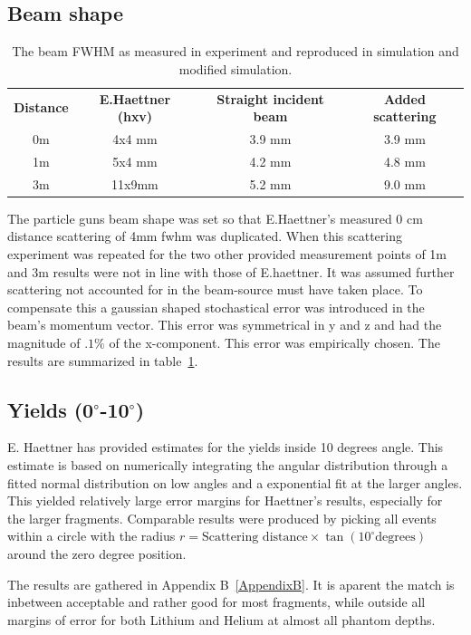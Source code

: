 \subsection{Beam shape\label{beamShapeAnalysis}}
\begin{center}
 \begin{table}[!h]
\begin{tabular}{cccc} %
\textbf{Distance} & \textbf{E.Haettner (hxv)} & \textbf{Straight incident beam} & \textbf{Added scattering} \\
0m &4x4 mm& 3.9 mm & 3.9 mm\\
1m &5x4 mm & 4.2 mm & 4.8 mm\\
3m &11x9mm& 5.2 mm & 9.0 mm\\
\end{tabular} 
\caption{\label{fig:beamFWHMtable} The beam FWHM as measured in experiment and reproduced in simulation and modified simulation.}
\end{table}
\end{center}
The particle guns beam shape was set so that E.Haettner's measured 0 cm distance scattering of 4mm fwhm was duplicated. When this scattering experiment was repeated for the two other provided measurement points of 1m and 3m results were not in line with those of E.haettner. It was assumed further scattering not accounted for in the beam-source must have taken place. To compensate this a gaussian shaped stochastical error was introduced in the beam's momentum vector. This error was symmetrical in y and z and had the magnitude of $.1 \%$ of the x-component. This error was empirically chosen. The results are summarized in table~\ref{fig:beamFWHMtable}.


\subsection{Yields (0$^\circ$-10$^\circ$)}
E. Haettner has provided estimates for the yields inside 10 degrees angle. This estimate is based on numerically integrating the angular distribution through a fitted normal distribution on low angles and a exponential fit at the larger angles. This yielded relatively large error margins for Haettner's results, especially for the larger fragments. Comparable results were produced by picking all events within a circle with the radius $r = \text{Scattering distance} \times \tan(10^{\circ} \text{degrees})$ around the zero degree position.

The results are gathered in Appendix B~\ref{AppendixB}. It is aparent the match is inbetween acceptable and rather good for most fragments, while outside all margins of error for both Lithium and Helium at almost all phantom depths.



